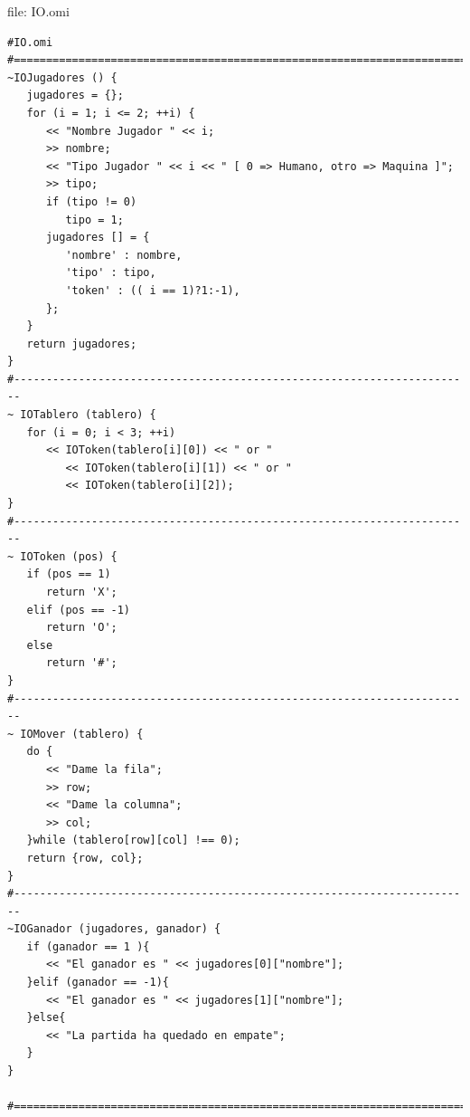 file: IO.omi
\begin{lstlisting}
#IO.omi
#=======================================================================
~IOJugadores () {
   jugadores = {};
   for (i = 1; i <= 2; ++i) {
      << "Nombre Jugador " << i;
      >> nombre;
      << "Tipo Jugador " << i << " [ 0 => Humano, otro => Maquina ]";
      >> tipo;
      if (tipo != 0) 
         tipo = 1;
      jugadores [] = { 
         'nombre' : nombre,
         'tipo' : tipo,
         'token' : (( i == 1)?1:-1),
      };
   }
   return jugadores; 
}
#-----------------------------------------------------------------------
~ IOTablero (tablero) {
   for (i = 0; i < 3; ++i) 
      << IOToken(tablero[i][0]) << " or " 
         << IOToken(tablero[i][1]) << " or " 
         << IOToken(tablero[i][2]);
}
#-----------------------------------------------------------------------
~ IOToken (pos) {
   if (pos == 1) 
      return 'X';
   elif (pos == -1)
      return 'O';
   else
      return '#';
}
#-----------------------------------------------------------------------
~ IOMover (tablero) {
   do {
      << "Dame la fila";
      >> row;
      << "Dame la columna";
      >> col;
   }while (tablero[row][col] !== 0);
   return {row, col};
}
#-----------------------------------------------------------------------
~IOGanador (jugadores, ganador) {
   if (ganador == 1 ){
      << "El ganador es " << jugadores[0]["nombre"];
   }elif (ganador == -1){
      << "El ganador es " << jugadores[1]["nombre"];
   }else{
      << "La partida ha quedado en empate";
   }
}

#=======================================================================
\end{lstlisting}

